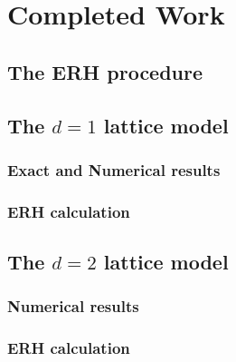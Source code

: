 \chapter{Completed Work}




\section{The ERH procedure}



\section{The $d=1$ lattice model}

\subsection{Exact and Numerical results}

\subsection{ERH calculation}



\section{The $d=2$ lattice model}

\subsection{Numerical results}

\subsection{ERH calculation}



